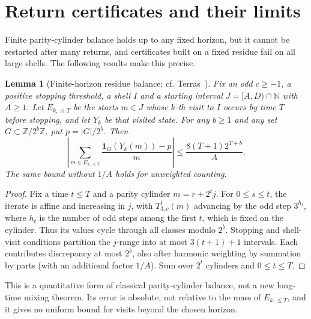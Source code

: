 \documentclass[11pt]{article}
\newtheorem{lemma}[theorem]{Lemma}
\theoremstyle{remark}
\newcommand{\N}{\mathbb{N}}
\newcommand{\Z}{\mathbb{Z}}
\begin{document}
\section{Return certificates and their limits}

Finite parity-cylinder balance holds up to any fixed horizon, but it
cannot be restarted after many returns, and certificates built on a fixed
residue fail on all large shells. The following results make this
precise.

\begin{lemma}[Finite-horizon residue balance; cf. Terras~\cite{Terras_1976}]
\label{lem:finite-horizon-residue}
Fix an odd $c\ge-1$, a positive stopping threshold, a shell $I$ and a
starting interval $J=[A,D)\cap\N$ with $A\ge1$. Let $E_{k,\le T}$ be
the starts $m\in J$ whose $k$-th visit to $I$ occurs by time $T$ before stopping,
and let $Y_k$ be that visited state. For any $b\ge1$ and any set
$G\subset\Z/2^b\Z$, put $p=|G|/2^b$. Then
\[
\left|\sum_{m\in E_{k,\le T}}\frac{\mathbf1_G(Y_k(m))-p}{m}\right|
\le\frac{8(T+1)2^{T+b}}{A}.
\]
The same bound without $1/A$ holds for unweighted counting.
\end{lemma}
\begin{proof}
Fix a time $t\le T$ and a parity cylinder $m=r+2^t j$.
For $0\le s\le t$, the iterate is affine and increasing in $j$,
with $T_{3,c}^t(m)$ advancing by the odd step $3^{h_t}$, where $h_t$ is
the number of odd steps among the first $t$, which is fixed on the cylinder.
Thus its values cycle through all classes modulo $2^b$.
Stopping and shell-visit conditions partition the $j$-range into at
most $3(t+1)+1$ intervals. Each contributes discrepancy at most
$2^b$, also after harmonic weighting by summation by parts (with an
additional factor $1/A$). Sum over $2^t$ cylinders and $0\le t\le T$.
\end{proof}
This is a quantitative form of classical parity-cylinder balance,
not a new long-time mixing theorem. Its error is absolute, not
relative to the mass of $E_{k,\le T}$, and it gives no uniform bound
for visits beyond the chosen horizon.
\end{document}

